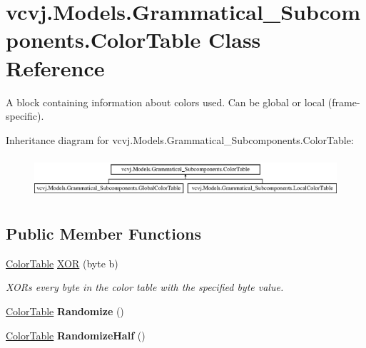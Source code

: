 \hypertarget{classvcvj_1_1_models_1_1_grammatical___subcomponents_1_1_color_table}{}\section{vcvj.\+Models.\+Grammatical\+\_\+\+Subcomponents.\+Color\+Table Class Reference}
\label{classvcvj_1_1_models_1_1_grammatical___subcomponents_1_1_color_table}


A block containing information about colors used. Can be global or local (frame-\/specific).  


Inheritance diagram for vcvj.\+Models.\+Grammatical\+\_\+\+Subcomponents.\+Color\+Table\+:\begin{figure}[H]
\begin{center}
\leavevmode
\includegraphics[height=1.555556cm]{classvcvj_1_1_models_1_1_grammatical___subcomponents_1_1_color_table}
\end{center}
\end{figure}
\subsection*{Public Member Functions}
\begin{DoxyCompactItemize}
\item 
\hyperlink{classvcvj_1_1_models_1_1_grammatical___subcomponents_1_1_color_table}{Color\+Table} \hyperlink{classvcvj_1_1_models_1_1_grammatical___subcomponents_1_1_color_table_a724c64bb00cb26222ea6c753970c9df2}{X\+OR} (byte b)
\begin{DoxyCompactList}\small\item\em X\+O\+Rs every byte in the color table with the specified byte value. \end{DoxyCompactList}\item 
\hyperlink{classvcvj_1_1_models_1_1_grammatical___subcomponents_1_1_color_table}{Color\+Table} {\bfseries Randomize} ()\hypertarget{classvcvj_1_1_models_1_1_grammatical___subcomponents_1_1_color_table_a23d1569e73caac21cfe3819afb14a7a3}{}\label{classvcvj_1_1_models_1_1_grammatical___subcomponents_1_1_color_table_a23d1569e73caac21cfe3819afb14a7a3}

\item 
\hyperlink{classvcvj_1_1_models_1_1_grammatical___subcomponents_1_1_color_table}{Color\+Table} {\bfseries Randomize\+Half} ()\hypertarget{classvcvj_1_1_models_1_1_grammatical___subcomponents_1_1_color_table_a781e9bba18f6d258e4892b0e793c9873}{}\label{classvcvj_1_1_models_1_1_grammatical___subcomponents_1_1_color_table_a781e9bba18f6d258e4892b0e793c9873}

\end{DoxyCompactItemize}
